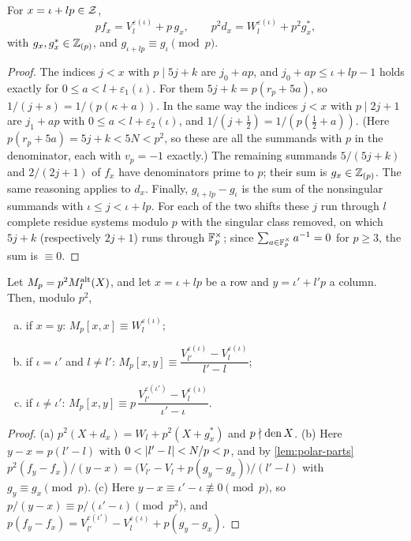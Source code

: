 \begin{lemma}\label{lem:polar-parts}
For $x=\iota+lp\in\mathcal{Z}$,
\[
  pf_x=V^{\varepsilon(\iota)}_l+p\,g_x,\qquad p^2d_x=W^{\varepsilon(\iota)}_l+p^2g^*_x,
\]
with $g_x,g^*_x\in\mathbb{Z}_{(p)}$, and $g_{\iota+lp}\equiv g_\iota\pmod p$.
\end{lemma}

\begin{proof}
The indices $j<x$ with $p\mid5j+k$ are $j_0+ap$, and $j_0+ap\le\iota+lp-1$ holds exactly for
$0\le a<l+\varepsilon_1(\iota)$. For them $5j+k=p(r_p+5a)$, so $1/(j+s)=1/(p(\kappa+a))$. In the
same way the indices $j<x$ with $p\mid2j+1$ are $j_1+ap$ with $0\le a<l+\varepsilon_2(\iota)$, and
$1/(j+\frac12)=1/(p(\frac12+a))$. (Here $p(r_p+5a)=5j+k<5N<p^2$, so these are all the
summands with $p$ in the denominator, each with $v_p=-1$ exactly.) The remaining summands
$5/(5j+k)$ and $2/(2j+1)$ of $f_x$ have denominators prime to $p$; their sum is $g_x\in\mathbb{Z}_{(p)}$. The
same reasoning applies to $d_x$. Finally, $g_{\iota+lp}-g_\iota$ is the sum of the nonsingular summands with
$\iota\le j<\iota+lp$. For each of the two shifts these $j$ run through $l$ complete residue
systems modulo $p$ with the singular class removed, on which $5j+k$ (respectively $2j+1$) runs
through $\mathbb{F}_p^\times$; since $\sum_{a\in\mathbb{F}_p^\times}a^{-1}=0$ for $p\ge3$, the sum is $\equiv0$.
\end{proof}

\begin{lemma}\label{lem:two-layer}
Let $M_p=p^2M^{\mathrm{alt}}_I(X)$, and let $x=\iota+lp$ be a row and $y=\iota'+l'p$ a column. Then,
modulo $p^2$,
\begin{enumerate}[(a)]
  \item if $x=y$: $M_p[x,x]\equiv W^{\varepsilon(\iota)}_l$;
  \item if $\iota=\iota'$ and $l\ne l'$:
  $M_p[x,y]\equiv\dfrac{V^{\varepsilon(\iota)}_{l'}-V^{\varepsilon(\iota)}_l}{l'-l}$;
  \item if $\iota\ne\iota'$:
  $M_p[x,y]\equiv p\,\dfrac{V^{\varepsilon(\iota')}_{l'}-V^{\varepsilon(\iota)}_l}{\iota'-\iota}$.
\end{enumerate}
\end{lemma}

\begin{proof}
(a) $p^2(X+d_x)=W_l+p^2(X+g^*_x)$ and $p\nmid\operatorname{den} X$. (b) Here $y-x=p(l'-l)$ with
$0<\lvert l'-l\rvert<N/p<p$, and by \cref{lem:polar-parts}
$p^2(f_y-f_x)/(y-x)=\bigl(V_{l'}-V_l+p(g_y-g_x)\bigr)/(l'-l)$ with $g_y\equiv g_x\pmod p$. (c)
Here $y-x\equiv\iota'-\iota\not\equiv0\pmod p$, so $p/(y-x)\equiv p/(\iota'-\iota)\pmod{p^2}$, and
$p(f_y-f_x)=V_{l'}^{\varepsilon(\iota')}-V^{\varepsilon(\iota)}_l+p(g_y-g_x)$.
\end{proof}

